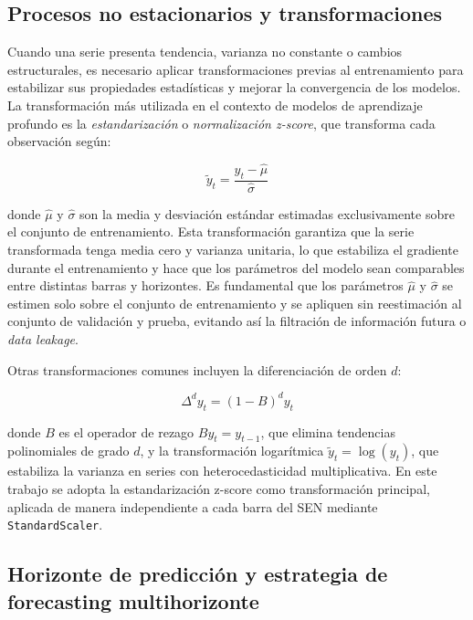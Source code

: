 \subsection{Procesos no estacionarios y transformaciones}

Cuando una serie presenta tendencia, varianza no constante o cambios estructurales, es necesario aplicar transformaciones previas al entrenamiento para estabilizar sus propiedades estadísticas y mejorar la convergencia de los modelos. La transformación más utilizada en el contexto de modelos de aprendizaje profundo es la \textit{estandarización} o \textit{normalización z-score}, que transforma cada observación según:

\begin{equation}
    \tilde{y}_t = \frac{y_t - \hat{\mu}}{\hat{\sigma}}
\end{equation}

donde $\hat{\mu}$ y $\hat{\sigma}$ son la media y desviación estándar estimadas exclusivamente sobre el conjunto de entrenamiento. Esta transformación garantiza que la serie transformada tenga media cero y varianza unitaria, lo que estabiliza el gradiente durante el entrenamiento y hace que los parámetros del modelo sean comparables entre distintas barras y horizontes. Es fundamental que los parámetros $\hat{\mu}$ y $\hat{\sigma}$ se estimen solo sobre el conjunto de entrenamiento y se apliquen sin reestimación al conjunto de validación y prueba, evitando así la filtración de información futura o \textit{data leakage}. 

Otras transformaciones comunes incluyen la diferenciación de orden $d$:

\begin{equation}
    \Delta^d y_t = (1 - B)^d y_t
\end{equation}

donde $B$ es el operador de rezago $By_t = y_{t-1}$, que elimina tendencias polinomiales de grado $d$, y la transformación logarítmica $\tilde{y}_t = \log(y_t)$, que estabiliza la varianza en series con heterocedasticidad multiplicativa. En este trabajo se adopta la estandarización z-score como transformación principal, aplicada de manera independiente a cada barra del SEN mediante \texttt{StandardScaler}.

\subsection{Horizonte de predicción y estrategia de forecasting multihorizonte}

